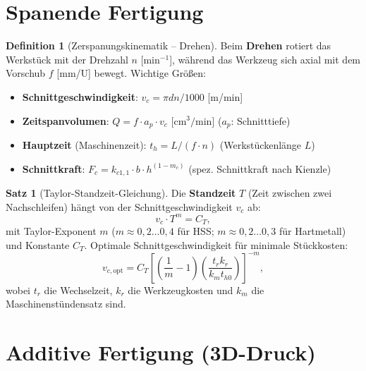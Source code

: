 ﻿\documentclass[a4paper,12pt]{report}
\theoremstyle{definition}
\newtheorem{definition}{Definition}
\newtheorem{satz}{Satz}
\begin{document}
\section{Spanende Fertigung}

\begin{definition}[Zerspanungskinematik -- Drehen]
Beim \textbf{Drehen} rotiert das Werkst\"uck mit der Drehzahl $n$ [min$^{-1}$],
w\"ahrend das Werkzeug sich axial mit dem Vorschub $f$ [mm/U] bewegt.
Wichtige Gr\"o\ss{}en:
\begin{itemize}
    \item[-] \textbf{Schnittgeschwindigkeit}: $v_c = \pi d n / 1000$ [m/min]
    \item[-] \textbf{Zeitspanvolumen}: $Q = f\cdot a_p\cdot v_c$ [$\mathrm{cm^3/min}$] ($a_p$: Schnitttiefe)
    \item[-] \textbf{Hauptzeit} (Maschinenzeit): $t_h = L/(f\cdot n)$ (Werkst\"uckenl\"ange $L$)
    \item[-] \textbf{Schnittkraft}: $F_c = k_{c1,1}\cdot b\cdot h^{(1-m_c)}$ (spez. Schnittkraft nach Kienzle)
\end{itemize}
\end{definition}

\begin{satz}[Taylor-Standzeit-Gleichung]
Die \textbf{Standzeit} $T$ (Zeit zwischen zwei Nachschleifen) h\"angt
von der Schnittgeschwindigkeit $v_c$ ab:
\[
  v_c\cdot T^m = C_T,
\]
mit Taylor-Exponent $m$ ($m \approx 0{,}2\ldots0{,}4$ f\"ur HSS;
$m \approx 0{,}2\ldots0{,}3$ f\"ur Hartmetall) und Konstante $C_T$.
Optimale Schnittgeschwindigkeit f\"ur minimale St\"uckkosten:
\[
  v_{c,\text{opt}} = C_T\left[\left(\frac{1}{m}-1\right)\left(\frac{t_r k_r}{k_m t_{h0}}\right)\right]^{-m},
\]
wobei $t_r$ die Wechselzeit, $k_r$ die Werkzeugkosten und $k_m$ die Maschinenst\"undensatz sind.
\end{satz}

\section{Additive Fertigung (3D-Druck)}
\end{document}
